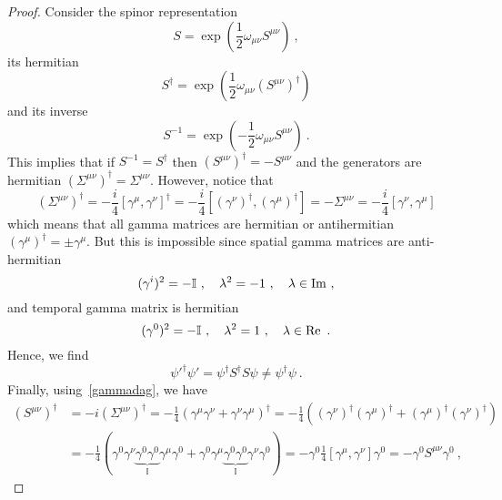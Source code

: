     \begin{proof}
        Consider the spinor representation
        \begin{equation*}
            S = \exp ( \frac{1}{2} \omega_{\mu\nu} S^{\mu\nu}) ~,
        \end{equation*}
        its hermitian 
        \begin{equation*}
            S^\dagger = \exp ( \frac{1}{2} \omega_{\mu\nu} (S^{\mu\nu})^\dagger)
        \end{equation*}
        and its inverse 
        \begin{equation*}
            S^{-1} = \exp ( - \frac{1}{2} \omega_{\mu\nu} S^{\mu\nu}) ~.
        \end{equation*}
        This implies that if $S^{-1} = S^{\dagger}$ then $(S^{\mu\nu})^\dagger = - S^{\mu\nu}$ and the generators are hermitian $(\Sigma^{\mu\nu})^\dagger = \Sigma^{\mu\nu}$. However, notice that
        \begin{equation*}
            (\Sigma^{\mu\nu})^\dagger = - \frac{i}{4} [\gamma^\mu, \gamma^\nu]^\dagger = - \frac{i}{4} [(\gamma^\nu)^\dagger, (\gamma^\mu)^\dagger] = - \Sigma^{\mu\nu} = - \frac{i}{4} [\gamma^\nu, \gamma^\mu]
        \end{equation*}
        which means that all gamma matrices are hermitian or antihermitian $(\gamma^\mu)^\dagger = \pm \gamma^\mu$. But this is impossible since spatial gamma matrices are anti-hermitian
        \begin{equation*}
            (\gamma^i)^2 = - \mathbb I ~, \quad \lambda^2 = - 1 ~, \quad \lambda \in \operatorname{Im} ~,
        \end{equation*}
        and temporal gamma matrix is hermitian 
        \begin{equation*}
            (\gamma^0)^2 = - \mathbb I ~, \quad \lambda^2 = 1 ~, \quad \lambda \in \operatorname{Re} ~.
        \end{equation*}
        Hence, we find
        \begin{equation*}
            {\psi'}^\dagger \psi' = \psi^\dagger S^\dagger S \psi \neq \psi^\dagger \psi ~.
        \end{equation*}
        Finally, using~\eqref{gammadag}, we have
        \begin{equation*}
        \begin{aligned}
            (S^{\mu\nu})^\dagger & = - i (\Sigma^{\mu\nu})^\dagger = - \frac{1}{4} (\gamma^\mu \gamma^\nu + \gamma^\nu \gamma^\mu)^\dagger = - \frac{1}{4} ((\gamma^\nu)^\dagger (\gamma^\mu)^\dagger + (\gamma^\mu)^\dagger (\gamma^\nu)^\dagger ) \\ & = - \frac{1}{4} (\gamma^0 \gamma^\nu \underbrace{\gamma^0 \gamma^0}_{\mathbb I} \gamma^\mu \gamma^0 + \gamma^0 \gamma^\mu \underbrace{\gamma^0 \gamma^0}_{\mathbb I} \gamma^\nu \gamma^0) = - \gamma^0 \frac{1}{4} [\gamma^\mu, \gamma^\nu] \gamma^0 = - \gamma^0 S^{\mu\nu} \gamma^0 ~,

\end{aligned}
\end{equation*}
\end{proof}
